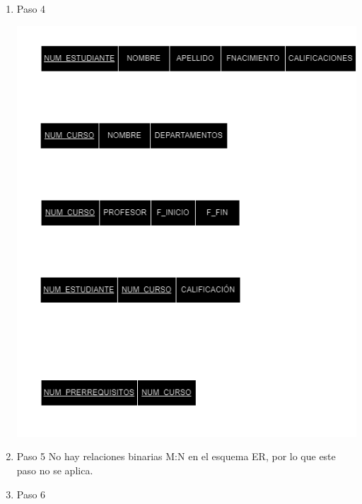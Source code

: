 \documentclass[a4paper,12pt]{article}
\begin{document}
\begin{enumerate}
    \item[] Paso 4
    \thispagestyle{fancy} %
    \begin{center}
        \includegraphics[scale = .5]{IMA/E1P4.png}    
    \end{center}
    
    \item[] Paso 5
    \thispagestyle{fancy} %
    No hay relaciones binarias M:N en el esquema ER, por lo que este paso no se aplica.

    \newpage
    \item[] Paso 6


\end{enumerate}
\end{document}
